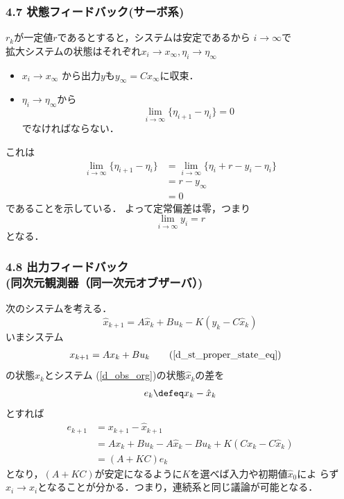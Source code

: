 \begin{frame}[t]
\frametitle{4.7 状態フィードバック(サーボ系)}
$r_k$が一定値$r$であるとすると，システムは安定であるから
$i\rightarrow \infty $で\\
拡大システムの状態はそれぞれ$x_i \to x_\infty , \eta_i \to \eta_\infty$\\
\begin{itemize}
	\item $x_i \to x_\infty$ から出力$y$も$y_{\infty} = C x_{\infty}$に収束．
	\item $\eta_i \to \eta_\infty$から
		\begin{equation}
		 \lim_{i \rightarrow \infty} \{\eta_{i+1}-\eta_{i}\} = 0
		\end{equation}
		でなければならない．
\end{itemize}
これは
		\begin{align}
		 \lim_{i \rightarrow \infty} \{ \eta_{i+1} - \eta_i \}
		  &= \lim_{i \rightarrow \infty}
		  \{ \eta_i + r - y_i - \eta_i \}\nonumber \\
		 &= r - y_{\infty}\nonumber \\
		 &= 0
\end{align}
であることを示している．
よって定常偏差は零，つまり
\begin{equation}
 \lim_{i \rightarrow \infty} y_i = r
\end{equation}
となる．
\end{frame}

\begin{frame}[t]
\frametitle{4.8 出力フィードバック\\
(同次元観測器（同一次元オブザーバ）)}
次のシステムを考える．
\begin{equation}
 \hat{x}_{k+1} = A \hat{x}_k + B u_k - K (y_k - C \hat{x}_k)
  \label{d_obs_org}
\end{equation}
いまシステム
\begin{align}
   x_{k+1} &= A x_k + B u_k \tag{\ref{d_st_proper_state_eq}}
\end{align}
の状態$x_k$とシステム
(\ref{d_obs_org})の状態$\hat{x}_k$の差を
\begin{equation}
 e_k \defeq x_k - \hat{x}_k
\end{equation}
とすれば
\begin{align}
 e_{k+1} &= x_{k+1} - \hat{x}_{k+1} \nonumber \\
         &= A x_k + B u_k 
	  - A \hat{x}_k - B u_k + K ( C x_k - C \hat{x}_k) \nonumber \\
         &= (A + KC) e_k
\end{align}
となり，$(A + KC)$が安定になるように$K$を選べば入力や初期値$\hat{x}_0$によ
らず$\hat{x}_i \rightarrow x_i$となることが分かる．つまり，連続系と同じ議論が可能となる．
\end{frame}

